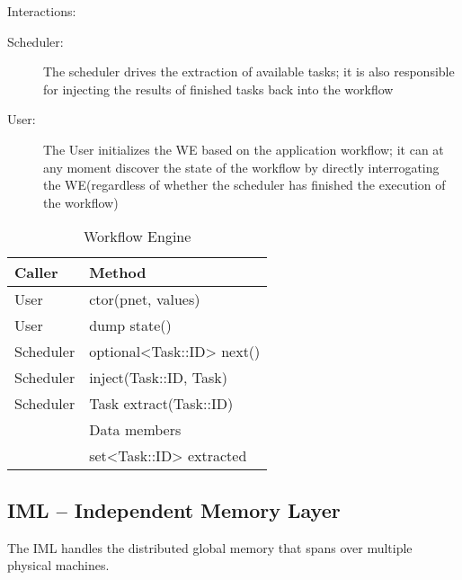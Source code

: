 \documentclass[10pt]{article}
\newcommand{\user}{User\xspace}
\newcommand{\sched}{Scheduler\xspace}
\newcommand{\iml}{IML\xspace}
\newcommand{\we}{WE\xspace}
\newcommand{\task}{Task\xspace}
\newcommand{\id}{::ID\xspace}
\begin{document}
Interactions:
\begin{description}
    \item [\sched:] The scheduler drives the extraction of available tasks; it
    is also responsible for injecting the results of finished tasks back into the
    workflow
    \item [\user:] The \user initializes the \we based on the application
    workflow; it can at any moment discover the state of the workflow by directly
    interrogating the \we (regardless of whether the scheduler has finished the
    execution of the workflow)
\end{description}
%
\begin{table}[ht]
    \centering
    \caption{Workflow Engine}
    \label{tab:we}
    \bgroup
    \setlength{\tabcolsep}{2em}
    \begin{tabular}{ll}
        \toprule
        Caller & Method \\
        \midrule
        \user & ctor(pnet, values) \\
        \user & dump state() \\
        \sched & optional<\task\id> next()  \\
        \sched & inject(\task\id, \task) \\
        \sched & \task extract(\task\id) \\
        \midrule
        & Data members \\
        \midrule
        & set<\task\id> extracted \\
        \bottomrule
    \end{tabular}
    \egroup
\end{table}
%

\subsection{IML -- Independent Memory Layer}
The \iml handles the distributed global memory that spans over multiple 
physical machines.
\end{document}
